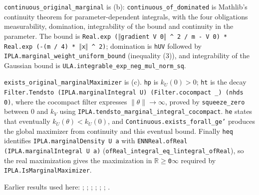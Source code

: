 \documentclass[11pt,a4paper]{article}
\begin{document}
\begin{leanbox}
\texttt{continuous\_\allowbreak{}original\_\allowbreak{}marginal} is (b): \texttt{continuous\_\allowbreak{}of\_\allowbreak{}dominated} is Mathlib's continuity theorem for parameter-dependent integrals, with the four obligations measurability, domination, integrability of the bound and continuity in the parameter. The bound is \texttt{Real.\allowbreak{}exp (\ensuremath{\Vert}gradient V 0\ensuremath{\Vert} \textasciicircum{} 2 /\allowbreak{} m -\allowbreak{} V 0) * Real.\allowbreak{}exp (-\allowbreak{}(m /\allowbreak{} 4) * \ensuremath{\Vert}x\ensuremath{\Vert} \textasciicircum{} 2)}; domination is \texttt{h\allowbreak{}UV} followed by \texttt{IPLA.\allowbreak{}marginal\_\allowbreak{}weight\_\allowbreak{}uniform\_\allowbreak{}bound} (inequality (3)), and integrability of the Gaussian bound is \texttt{ULA.\allowbreak{}integrable\_\allowbreak{}exp\_\allowbreak{}neg\_\allowbreak{}mul\_\allowbreak{}norm\_\allowbreak{}sq}.




\texttt{exists\_\allowbreak{}original\_\allowbreak{}marginal\allowbreak{}Maximizer} is (c). \texttt{hp} is \(k_U(0)>0\); \texttt{ht} is the decay \texttt{Filter.\allowbreak{}Tendsto (IPLA.\allowbreak{}marginal\allowbreak{}Integral U) (Filter.\allowbreak{}cocompact \_\allowbreak{}) (nhds 0)}, where the cocompact filter expresses \(\|\theta\|\to\infty\), proved by \texttt{squeeze\_\allowbreak{}zero} between \(0\) and \(k_V\) using \texttt{IPLA.\allowbreak{}tendsto\_\allowbreak{}marginal\_\allowbreak{}integral\_\allowbreak{}cocompact}. \texttt{he} states that eventually \(k_U(\theta)<k_U(0)\), and \texttt{Continuous.\allowbreak{}exists\_\allowbreak{}forall\_\allowbreak{}ge'} produces the global maximizer from continuity and this eventual bound. Finally \texttt{heq} identifies \texttt{IPLA.\allowbreak{}marginal\allowbreak{}Density U a} with \texttt{ENNReal.\allowbreak{}of\allowbreak{}Real (IPLA.\allowbreak{}marginal\allowbreak{}Integral U a)} (\texttt{of\allowbreak{}Real\_\allowbreak{}integral\_\allowbreak{}eq\_\allowbreak{}lintegral\_\allowbreak{}of\allowbreak{}Real}), so the real maximization gives the maximization in \texttt{\ensuremath{\mathbb R}\ensuremath{\ge}0\ensuremath{\infty}} required by \texttt{IPLA.\allowbreak{}Is\allowbreak{}Marginal\allowbreak{}Maximizer}.
\end{leanbox}


Earlier results used here: \cite[Section~3.26.4]{LangevinLean2026ULASC}; \cite[Section~3.1.1]{LangevinLean2026IPLA}; \cite[Section~3.11.1]{LangevinLean2026IPLA}; \cite[Section~3.12.1]{LangevinLean2026IPLA}; \cite[Section~3.3.1]{LangevinLean2026IPLA}; \cite[Section~3.9.2]{LangevinLean2026IPLA}; \cite[Section~3.9.4]{LangevinLean2026IPLA}.
\end{document}
